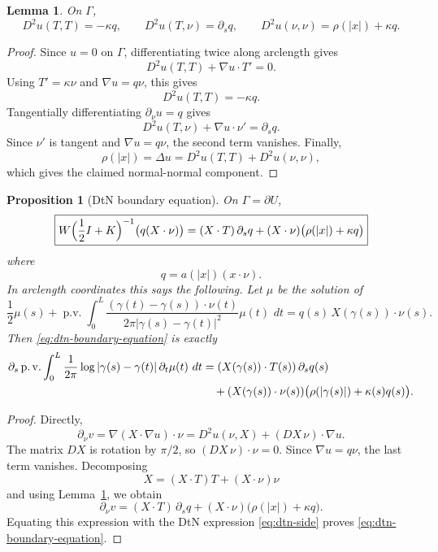\documentclass[11pt]{article}
\newtheorem{proposition}[theorem]{Proposition}
\newtheorem{lemma}[theorem]{Lemma}
\newcommand{\dd}{\,d}
\newcommand{\1}{\mathbf 1}
\begin{document}
\begin{lemma}\label{lem:boundary-jets}
On \(\Gamma\),
\[
  D^2u(T,T)=-\kappa q,\qquad
  D^2u(T,\nu)=\partial_s q,\qquad
  D^2u(\nu,\nu)=\rho(|x|)+\kappa q .
\]
\end{lemma}

\begin{proof}
Since \(u=0\) on \(\Gamma\), differentiating twice along arclength gives
\[
  D^2u(T,T)+\nabla u\cdot T'=0.
\]
Using \(T'=\kappa\nu\) and \(\nabla u=q\nu\), this gives
\[
  D^2u(T,T)=-\kappa q.
\]
Tangentially differentiating \(\partial_\nu u=q\) gives
\[
  D^2u(T,\nu)+\nabla u\cdot\nu'=\partial_s q.
\]
Since \(\nu'\) is tangent and \(\nabla u=q\nu\), the second term vanishes.  Finally,
\[
  \rho(|x|)
  =
  \Delta u
  =
  D^2u(T,T)+D^2u(\nu,\nu),
\]
which gives the claimed normal-normal component.
\end{proof}

\begin{proposition}[DtN boundary equation]\label{prop:dtn-equation}
On \(\Gamma=\partial U\),
\begin{equation}\label{eq:dtn-boundary-equation}
  \boxed{
  W\Bigl(\frac12 I+K\Bigr)^{-1}\bigl(q(X\cdot\nu)\bigr)
  =
  (X\cdot T)\,\partial_s q
  +(X\cdot\nu)\bigl(\rho(|x|)+\kappa q\bigr)
  }
\end{equation}
where
\[
  q=a(|x|)(x\cdot\nu).
\]
In arclength coordinates this says the following.  Let \(\mu\) be the solution of
\begin{equation}\label{eq:explicit-mu}
  \frac12\mu(s)
  +
  \operatorname{p.v.}\int_0^L
  \frac{(\gamma(t)-\gamma(s))\cdot\nu(t)}
       {2\pi|\gamma(s)-\gamma(t)|^2}
  \mu(t)\,\dd t
  =
  q(s)\,X(\gamma(s))\cdot\nu(s).
\end{equation}
Then \eqref{eq:dtn-boundary-equation} is exactly
\begin{align}\label{eq:explicit-param-equation}
  \partial_s
  \operatorname{p.v.}\int_0^L
  \frac{1}{2\pi}\log|\gamma(s)-\gamma(t)|\,\partial_t\mu(t)\,\dd t
  &=
  (X(\gamma(s))\cdot T(s))\,\partial_s q(s) \notag\\
  &\quad+
  (X(\gamma(s))\cdot\nu(s))
  \bigl(\rho(|\gamma(s)|)+\kappa(s)q(s)\bigr).
\end{align}
\end{proposition}

\begin{proof}
Directly,
\[
  \partial_\nu v
  =
  \nabla(X\cdot\nabla u)\cdot\nu
  =
  D^2u(\nu,X)+(DX\,\nu)\cdot\nabla u .
\]
The matrix \(DX\) is rotation by \(\pi/2\), so \((DX\,\nu)\cdot\nu=0\).  Since
\(\nabla u=q\nu\), the last term vanishes.  Decomposing
\[
  X=(X\cdot T)T+(X\cdot\nu)\nu
\]
and using Lemma~\ref{lem:boundary-jets}, we obtain
\[
  \partial_\nu v
  =
  (X\cdot T)\,\partial_s q
  +(X\cdot\nu)\bigl(\rho(|x|)+\kappa q\bigr).
\]
Equating this expression with the DtN expression \eqref{eq:dtn-side} proves
\eqref{eq:dtn-boundary-equation}.
\end{proof}
\end{document}
